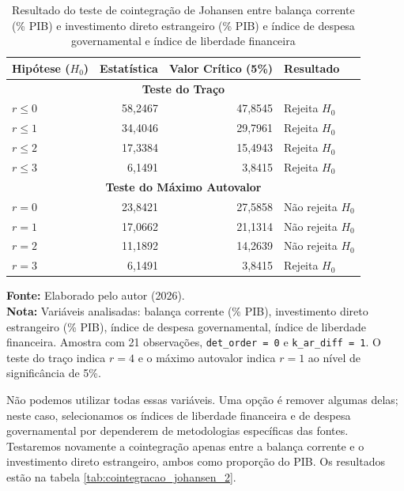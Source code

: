 \begin{table}[htbp]
	\centering
	\caption{Resultado do teste de cointegração de Johansen entre balança corrente (\% PIB) e investimento direto estrangeiro (\% PIB) e índice de despesa governamental e índice de liberdade financeira}
	\label{tab:cointegracao_johansen}
	\begin{tabular}{lrrl}
		\toprule
		\textbf{Hipótese ($H_0$)} & \textbf{Estatística} & \textbf{Valor Crítico (5\%)} & \textbf{Resultado} \\
		\midrule
		\multicolumn{4}{c}{\textbf{Teste do Traço}} \\
		\midrule
		$r \leq 0$ & 58,2467 & 47,8545 & Rejeita $H_0$ \\
		$r \leq 1$ & 34,4046 & 29,7961 & Rejeita $H_0$ \\
		$r \leq 2$ & 17,3384 & 15,4943 & Rejeita $H_0$ \\
		$r \leq 3$ & 6,1491 & 3,8415 & Rejeita $H_0$ \\
		\midrule
		\multicolumn{4}{c}{\textbf{Teste do Máximo Autovalor}} \\
		\midrule
		$r = 0$ & 23,8421 & 27,5858 & Não rejeita $H_0$ \\
		$r = 1$ & 17,0662 & 21,1314 & Não rejeita $H_0$ \\
		$r = 2$ & 11,1892 & 14,2639 & Não rejeita $H_0$ \\
		$r = 3$ & 6,1491 & 3,8415 & Rejeita $H_0$ \\
		\bottomrule
	\end{tabular}
	
	\vspace{0.15cm}
	
	\begin{minipage}{0.85\textwidth}
		\footnotesize 
		\textbf{Fonte:} Elaborado pelo autor (2026).\\
		\textbf{Nota:} Variáveis analisadas: balança corrente (\% PIB), investimento direto estrangeiro (\% PIB), índice de despesa governamental, índice de liberdade financeira. Amostra com 21 observações, \texttt{det\_order = 0} e \texttt{k\_ar\_diff = 1}. O teste do traço indica $r = 4$ e o máximo autovalor indica $r = 1$ ao nível de significância de 5\%.
	\end{minipage}
\end{table}


Não podemos utilizar todas essas variáveis. Uma opção é remover algumas delas; neste caso, selecionamos os índices de liberdade financeira e de despesa governamental por dependerem de metodologias específicas das fontes. Testaremos novamente a cointegração apenas entre a balança corrente e o investimento direto estrangeiro, ambos como proporção do PIB. Os resultados estão na tabela \ref{tab:cointegracao_johansen_2}.


